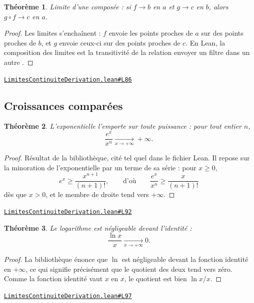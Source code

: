 \documentclass[11pt,a4paper]{article}
\theoremstyle{definition}
\theoremstyle{plain}
\newtheorem{theoreme}{Théorème}
\newcommand{\source}[2]{\par\smallskip\noindent\hfill{\footnotesize\href{#1}{\texttt{#2}}}\par\smallskip}
\begin{document}
\begin{theoreme}
Limite d'une composée : si $f \to b$ en $a$ et $g \to c$ en $b$, alors $g \circ f \to c$
en $a$.
\end{theoreme}

\begin{proof}
Les limites s'enchaînent : $f$ envoie les points proches de $a$ sur des points proches de
$b$, et $g$ envoie ceux-ci sur des points proches de $c$. En Lean, la composition des
limites est la transitivité de la relation \og{} envoyer un filtre dans un autre \fg{}.
\end{proof}
\source{https://github.com/Commutator-IO/learn-lean/blob/main/cours/02-lycee/04-limites-continuite-derivation/LimitesContinuiteDerivation.lean\#L86}{LimitesContinuiteDerivation.lean\#L86}

\subsection{Croissances comparées}

\begin{theoreme}
L'exponentielle l'emporte sur toute puissance : pour tout entier $n$,
\[ \frac{e^x}{x^n} \xrightarrow[x \to +\infty]{} +\infty . \]
\end{theoreme}

\begin{proof}
Résultat de la bibliothèque, cité tel quel dans le fichier Lean. Il repose sur la
minoration de l'exponentielle par un terme de sa série : pour $x \ge 0$,
\[ e^x \ge \frac{x^{n+1}}{(n+1)!} ,
   \qquad\text{d'où}\qquad \frac{e^x}{x^n} \ge \frac{x}{(n+1)!} \]
dès que $x > 0$, et le membre de droite tend vers $+\infty$.
\end{proof}
\source{https://github.com/Commutator-IO/learn-lean/blob/main/cours/02-lycee/04-limites-continuite-derivation/LimitesContinuiteDerivation.lean\#L92}{LimitesContinuiteDerivation.lean\#L92}

\begin{theoreme}
Le logarithme est négligeable devant l'identité :
\[ \frac{\ln x}{x} \xrightarrow[x \to +\infty]{} 0 . \]
\end{theoreme}

\begin{proof}
La bibliothèque énonce que $\ln$ est négligeable devant la fonction identité en
$+\infty$, ce qui signifie précisément que le quotient des deux tend vers zéro. Comme la
fonction identité vaut $x$ en $x$, le quotient est bien $\ln x / x$.
\end{proof}
\source{https://github.com/Commutator-IO/learn-lean/blob/main/cours/02-lycee/04-limites-continuite-derivation/LimitesContinuiteDerivation.lean\#L97}{LimitesContinuiteDerivation.lean\#L97}
\end{document}
